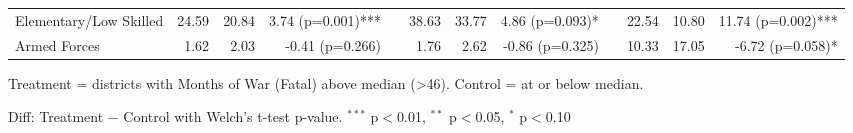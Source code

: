 \begin{table}[htbp]
\begin{tabular}{l rrr c rrr c rrr}
\quad Elementary/Low Skilled & 24.59 & 20.84 & 3.74 (p=0.001)*** &  & 38.63 & 33.77 & 4.86 (p=0.093)* &  & 22.54 & 10.80 & 11.74 (p=0.002)*** \\
\quad Armed Forces & 1.62 & 2.03 & -0.41 (p=0.266) &  & 1.76 & 2.62 & -0.86 (p=0.325) &  & 10.33 & 17.05 & -6.72 (p=0.058)* \\
\bottomrule
\end{tabular}
\begin{tablenotes}
\small
\item Treatment = districts with Months of War (Fatal) above median (>46). Control = at or below median.
\item Diff: Treatment $-$ Control with Welch's t-test p-value. $^{{***}}$ p$<$0.01, $^{{**}}$ p$<$0.05, $^{{*}}$ p$<$0.10
\end{tablenotes}
\end{table}

\clearpage

